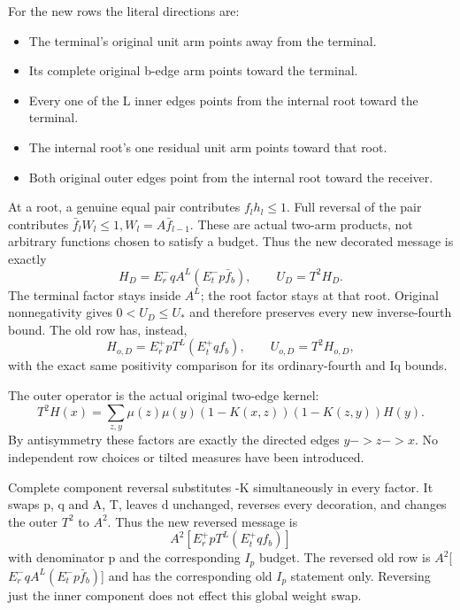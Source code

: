 For the new rows the literal directions are:

\begin{itemize}
\item The terminal's original unit arm points away from the terminal.
\item Its complete original b-edge arm points toward the terminal.
\item Every one of the L inner edges points from the internal root toward the terminal.
\item The internal root's one residual unit arm points toward that root.
\item Both original outer edges point from the internal root toward the receiver.
\end{itemize}

At a root, a genuine equal pair contributes \(f_l h_l\le 1.\) Full reversal
of the pair contributes \(\bar f_l W_l\le 1,\allowbreak  W_l=A \bar f_{l-1}\). These are actual
two-arm products, not arbitrary functions chosen to satisfy a budget.
Thus the new decorated message is exactly
\[
H_D=E_r^-qA^L(E_t^-p\bar f_b),\qquad U_D=T^2H_D.
\]
The terminal factor stays inside \(A^L\); the root factor stays at that root.
Original nonnegativity gives \(0<U_D\le U_*\) and therefore preserves every
new inverse-fourth bound.
The old row has, instead,
\[
H_{o,D}=E_r^+pT^L(E_t^+qf_b),\qquad U_{o,D}=T^2H_{o,D},
\]
with the exact same positivity comparison for its ordinary-fourth and
Iq bounds.

The outer operator is the actual original two-edge kernel:
\[
T^2H(x)=\sum_{z,y}\mu(z)\mu(y)
(1-K(x,z))(1-K(z,y))H(y).
\]
By antisymmetry these factors are exactly the directed edges \(y->z->x.\)
No independent row choices or tilted measures have been introduced.

Complete component reversal substitutes -K simultaneously in every
factor. It swaps p, q and A, T, leaves d unchanged, reverses every
decoration, and changes the outer \(T^2\) to \(A^2.\) Thus the new reversed
message is
\[
A^2[E_r^+pT^L(E_t^+qf_b)]
\]
with denominator p and the corresponding \(I_p\) budget. The reversed old
row is \(A^2\)[\(E_r^-qA^L(E_t^-p\bar f_b)\)] and has the corresponding old \(I_p\)
statement only. Reversing just the inner component does not effect this
global weight swap.
